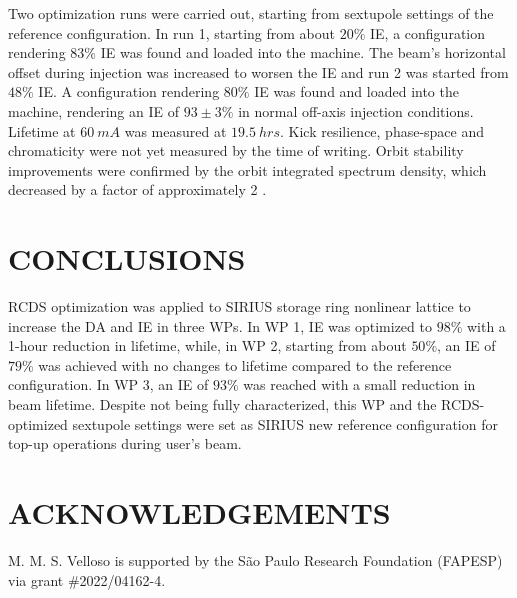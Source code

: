 \documentclass[a4paper,
               keeplastbox,   %
               ]{jacow}
\begin{document}
Two optimization runs were carried out, starting from sextupole settings of the reference configuration. In run 1, starting from about $20\%$ IE, a configuration rendering $83\%$ IE was found and loaded into the machine. The beam's horizontal offset during injection was increased to worsen the IE and run 2 was started from $48\%$ IE. A configuration rendering $80\%$ IE was found and loaded into the machine, rendering an IE of $93\pm3\%$ in normal off-axis injection conditions. Lifetime at $60~\unit{mA}$ was measured at $19.5~\unit{hrs}$. Kick resilience, phase-space and chromaticity were not yet measured by the time of writing. Orbit stability improvements were confirmed by the orbit integrated spectrum density, which decreased by a factor of approximately 2 \cite{Liu:IPAC23-WEOGA2}.

\section{CONCLUSIONS}
RCDS optimization was applied to SIRIUS storage ring nonlinear lattice to increase the DA and IE in three WPs. In WP 1, IE was optimized to $98\%$ with a 1-hour reduction in lifetime, while, in WP 2, starting from about $50\%$, an IE of $79\%$ was achieved with no changes to lifetime compared to the reference configuration. In WP 3, an IE of $93\%$ was reached with a small reduction in beam lifetime. Despite not being fully characterized, this WP and the RCDS-optimized sextupole settings were set as SIRIUS new reference configuration for top-up operations during user's beam.
\section{ACKNOWLEDGEMENTS}
M. M. S. Velloso is supported by the São Paulo Research Foundation (FAPESP) via grant \#2022/04162-4. 
%
%
	
\end{document}
